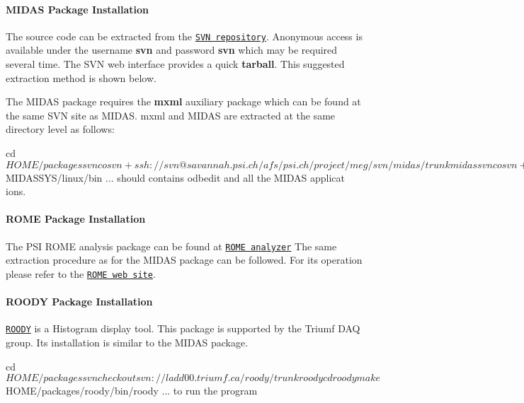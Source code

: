 \par
\hypertarget{Q_Linux_Q_Linux_Midas_Installation}{}\paragraph{MIDAS Package Installation}\label{Q_Linux_Q_Linux_Midas_Installation}
The source code can be extracted from the \href{http://savannah.psi.ch/viewcvs/trunk/?root=midas}{\tt SVN repository}. Anonymous access is available under the username {\bfseries svn} and password {\bfseries svn} which may be required several time. The SVN web interface provides a quick {\bfseries tarball}. This suggested extraction method is shown below. \par
 The MIDAS package requires the {\bfseries mxml} auxiliary package which can be found at the same SVN site as MIDAS. mxml and MIDAS are extracted at the same directory level as follows: 
\begin{DoxyCode}
  cd $HOME/packages
  svn co svn+ssh://svn@savannah.psi.ch/afs/psi.ch/project/meg/svn/midas/trunk mid
      as
  svn co svn+ssh://svn@savannah.psi.ch/afs/psi.ch/project/meg/svn/mxml/trunk mxml
      
  cd midas
  make
  ls $MIDASSYS/linux/bin   ... should contains odbedit and all the MIDAS applicat
      ions.
\end{DoxyCode}
 \par


\label{Q_Linux_idx_ROME_installation}
\hypertarget{Q_Linux_idx_ROME_installation}{}
 \hypertarget{Q_Linux_Q_Linux_Rome_Installation}{}\paragraph{ROME Package Installation}\label{Q_Linux_Q_Linux_Rome_Installation}
The PSI ROME analysis package can be found at \href{http://midas.psi.ch/rome/index.html}{\tt ROME analyzer} The same extraction procedure as for the MIDAS package can be followed. For its operation please refer to the \href{http://midas.psi.ch/rome/index.html}{\tt ROME web site}. 


\label{Q_Linux_idx_ROODY_installation}
\hypertarget{Q_Linux_idx_ROODY_installation}{}
 \hypertarget{Q_Linux_Q_Linux_Roody_Installation}{}\paragraph{ROODY Package Installation}\label{Q_Linux_Q_Linux_Roody_Installation}
\href{http://ladd00.triumf.ca/~daqweb/doc/roody/html}{\tt ROODY} is a Histogram display tool. This package is supported by the Triumf DAQ group. Its installation is similar to the MIDAS package. 
\begin{DoxyCode}
  cd $HOME/packages
  svn checkout svn://ladd00.triumf.ca/roody/trunk roody
  cd roody
  make
  $HOME/packages/roody/bin/roody   ... to run the program
\end{DoxyCode}





